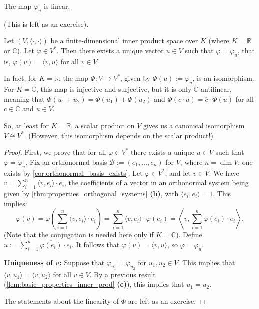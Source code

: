 \begin{claim*}
\label{claim:linearity_phi_u}
The map $\varphi_u$ is linear.
\end{claim*}
(This is left as an exercise).

\begin{theorem}
\label{thm:dual_space_inner_product_isomorphism}
Let $(V, \langle \cdot, \cdot \rangle)$ be a finite-di\-men\-sional inner product space over $K$ (where $K = \mathbb{R}$ or $\mathbb{C}$). Let $\varphi \in V^*$. Then there exists a unique vector $u \in V$ such that $\varphi = \varphi_u$, that is, $\varphi(v) = \langle v, u \rangle$ for all $v \in V$.

In fact, for $K = \mathbb{R}$, the map $\Phi \colon V \to V^*$, given by $\Phi(u) := \varphi_u$, is an isomorphism. For $K = \mathbb{C}$, this map is injective and surjective, but it is only $\mathbb{C}$-antilinear, meaning that $\Phi(u_1+u_2) = \Phi(u_1)+\Phi(u_2)$ and $\Phi(c \cdot u) = \overline{c} \cdot \Phi(u)$ for all $c \in \mathbb{C}$ and $u \in V$.

So, at least for $K = \mathbb{R}$, a scalar product on $V$ gives us a canonical isomorphism $V \cong V^*$. (However, this isomorphism depends on the scalar product!)
\end{theorem}

\begin{proof}
First, we prove that for all $\varphi \in V^*$ there exists a unique $u \in V$ such that $\varphi = \varphi_u$.
Fix an orthonormal basis $\mathcal{B} := (e_1, \dots, e_n)$ for $V$, where $n = \dim V$; one exists by \cref{cor:orthonormal_basis_exists}.
Let $\varphi \in V^*$, and let $v \in V$. We have $v = \sum_{i=1}^n \langle v, e_i \rangle \cdot e_i$, the coefficients of a vector in an orthonormal system being given by \cref{thm:properties_orthogonal_systems} \textbf{(b)}, with $\langle e_i, e_i \rangle = 1$. This implies:
\[
    \varphi(v) = \varphi\left( \sum_{i=1}^n \langle v, e_i \rangle \cdot e_i \right) = \sum_{i=1}^n \langle v, e_i \rangle \cdot \varphi(e_i) = \left\langle v, \sum_{i=1}^n \overline{\varphi(e_i)} \cdot e_i \right\rangle.
\]
(Note that the conjugation is needed here only if $K = \mathbb{C}$).
Define $u := \sum_{i=1}^n \overline{\varphi(e_i)} \cdot e_i$. It follows that $\varphi(v) = \langle v, u \rangle$, so $\varphi = \varphi_u$.

\textbf{Uniqueness of $u$:} Suppose that $\varphi_{u_1} = \varphi_{u_2}$ for $u_1, u_2 \in V$. This implies that $\langle v, u_1 \rangle = \langle v, u_2 \rangle$ for all $v \in V$. By a previous result (\cref{lem:basic_properties_inner_prod} \textbf{(c)}), this implies that $u_1 = u_2$.

The statements about the linearity of $\Phi$ are left as an exercise.
\end{proof}

